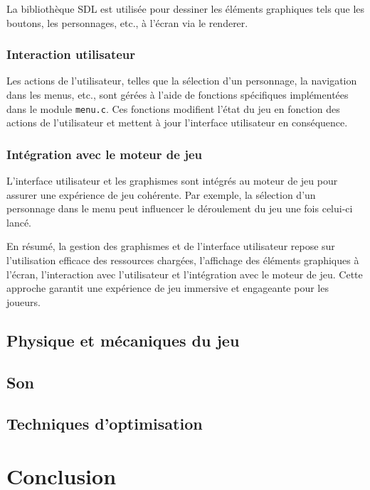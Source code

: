 \documentclass[a4paper,12pt]{article}
\begin{document}
La bibliothèque SDL est utilisée pour dessiner les éléments graphiques tels que les boutons, les personnages, etc., à l'écran via le renderer.
\subsubsection{Interaction utilisateur}

Les actions de l'utilisateur, telles que la sélection d'un personnage, la navigation dans les menus, etc., sont gérées à l'aide de fonctions spécifiques implémentées dans le module \texttt{menu.c}. Ces fonctions modifient l'état du jeu en fonction des actions de l'utilisateur et mettent à jour l'interface utilisateur en conséquence.

\subsubsection{Intégration avec le moteur de jeu}

L'interface utilisateur et les graphismes sont intégrés au moteur de jeu pour assurer une expérience de jeu cohérente. Par exemple, la sélection d'un personnage dans le menu peut influencer le déroulement du jeu une fois celui-ci lancé.

En résumé, la gestion des graphismes et de l'interface utilisateur repose sur l'utilisation efficace des ressources chargées, l'affichage des éléments graphiques à l'écran, l'interaction avec l'utilisateur et l'intégration avec le moteur de jeu. Cette approche garantit une expérience de jeu immersive et engageante pour les joueurs.


\subsection{Physique et mécaniques du jeu}

\subsection{Son}

\subsection{Techniques d'optimisation}

\section{Conclusion}
\end{document}
